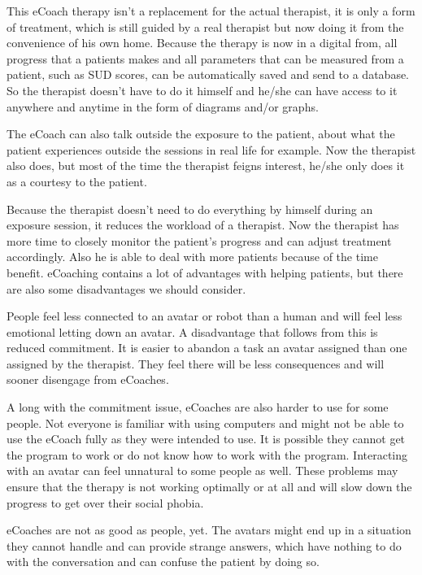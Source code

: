\documentclass[twoside]{article}
\begin{document}
\begin{multicols}{2}
This eCoach therapy isn't a replacement for the actual therapist, it is only a form of treatment, which is still guided by a real therapist but now doing it from the convenience of his own home. Because the therapy is now in a digital from, all progress that a patients makes and all parameters that can be measured from a patient, such as SUD scores, can be automatically saved and send to a database. So the therapist doesn't have to do it himself and he/she can have access to it anywhere and anytime in the form of diagrams and/or graphs.

The eCoach can also talk outside the exposure to the patient, about what the patient experiences outside the sessions in real life for example. Now the therapist also does, but most of the time the therapist feigns interest, he/she only does it as a courtesy to the patient.

Because the therapist doesn't need to do everything by himself during an exposure session, it reduces the workload of a therapist. Now the therapist has more time to closely monitor the patient's progress and can adjust treatment accordingly.  Also he is able to deal with more patients because of the time benefit\cite{ter2011design}.
eCoaching contains a lot of advantages with helping patients, but there are also some disadvantages we should consider. 

People feel less connected to an avatar or robot than a human and will feel less emotional letting down an avatar\cite{clutterbuck2009virtual}. A disadvantage that follows from this is reduced commitment. It is easier to abandon a task an avatar assigned than one assigned by the therapist. They feel there will be less consequences and will sooner disengage from eCoaches.

A long with the commitment issue, eCoaches are also harder to use for some people. Not everyone is familiar with using computers and might not be able to use the eCoach fully as they were intended to use. It is possible they cannot get the program to work or do not know how to work with the program. Interacting with an avatar can feel unnatural to some people as well. These problems may ensure that the therapy is not working optimally or at all and will slow down the progress to get over their social phobia.

eCoaches are not as good as people, yet. The avatars might end up in a situation they cannot handle and can provide strange answers, which have nothing to do with the conversation and can confuse the patient by doing so. 


\end{multicols}
\end{document}
